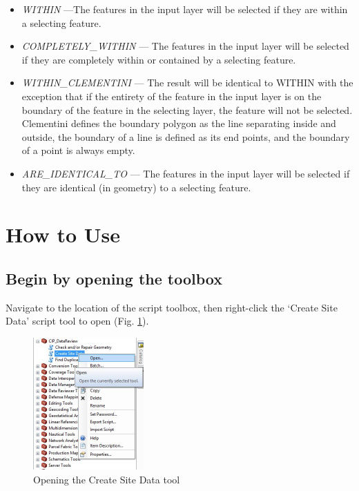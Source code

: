 \documentclass[openany]{book}
\theoremstyle{definition}
\theoremstyle{definition}
\theoremstyle{definition}
\theoremstyle{remark}
\begin{document}
\begin{enumerate}
\begin{itemize}
  \item
    \emph{WITHIN} ---The features in the input layer will be selected if
    they are within a selecting feature.\\
  \item
    \emph{COMPLETELY\_WITHIN} --- The features in the input layer will
    be selected if they are completely within or contained by a
    selecting feature.\\
  \item
    \emph{WITHIN\_CLEMENTINI} --- The result will be identical to WITHIN
    with the exception that if the entirety of the feature in the input
    layer is on the boundary of the feature in the selecting layer, the
    feature will not be selected. Clementini defines the boundary
    polygon as the line separating inside and outside, the boundary of a
    line is defined as its end points, and the boundary of a point is
    always empty.\\
  \item
    \emph{ARE\_IDENTICAL\_TO} --- The features in the input layer will
    be selected if they are identical (in geometry) to a selecting
    feature.
  \end{itemize}
\end{enumerate}

\section{How to Use}\label{how-to-use}

\subsection{Begin by opening the
toolbox}\label{begin-by-opening-the-toolbox}

Navigate to the location of the script toolbox, then right-click the
`Create Site Data' script tool to open (Fig. \ref{fig:csdopen}).

\begin{figure}[H]

{\centering \includegraphics[width=1.67in,]{figures/csd-open} 

}

\caption{Opening the Create Site Data tool}\label{fig:csdopen}
\end{figure}
\end{document}
